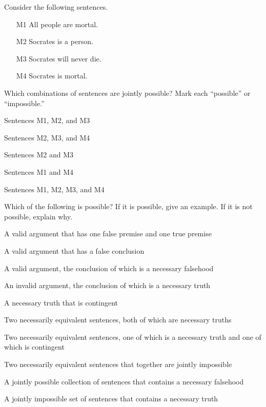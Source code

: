 \problempart Consider the following sentences.
\begin{enumerate}%
\item[M1] \label{itm:allmortal} All people are mortal.
\item[M2] \label{itm:socperson} Socrates is a person.
\item[M3] \label{itm:socnotdie} Socrates will never die.
\item[M4] \label{itm:socmortal} Socrates is mortal.
\end{enumerate}
Which combinations of sentences are jointly possible? Mark each ``possible'' or ``impossible.''
\begin{earg}
\item Sentences M1, M2, and M3
\item Sentences M2, M3, and M4
\item Sentences M2 and M3
\item Sentences M1 and M4
\item Sentences M1, M2, M3, and M4
\end{earg}

\problempart
\label{pr.EnglishCombinations2}
Which of the following is possible? If it is possible, give an example. If it is not possible, explain why.
\begin{earg}
\item A valid argument that has one false premise and one true premise

\item A valid argument that has a false conclusion

\item A valid argument, the conclusion of which is a necessary falsehood

\item An invalid argument, the conclusion of which is a necessary truth

\item A necessary truth that is contingent

\item Two necessarily equivalent sentences, both of which are necessary truths

\item Two necessarily equivalent sentences, one of which is a necessary truth and one of which is contingent

\item Two necessarily equivalent sentences that together are jointly impossible

\item A jointly possible collection of sentences that contains a necessary falsehood

\item A jointly impossible set of sentences that contains a necessary truth
\end{earg}

